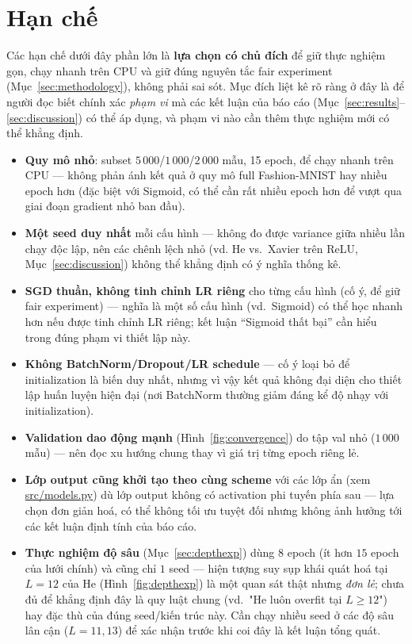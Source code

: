 \documentclass[12pt,a4paper]{article}
\begin{document}
\section{Hạn chế}
\label{sec:limitations}

Các hạn chế dưới đây phần lớn là \textbf{lựa chọn có chủ đích} để giữ thực
nghiệm gọn, chạy nhanh trên CPU và giữ đúng nguyên tắc fair experiment
(Mục~\ref{sec:methodology}), không phải sai sót. Mục đích liệt kê rõ ràng
ở đây là để người đọc biết chính xác \emph{phạm vi} mà các kết luận của
báo cáo (Mục~\ref{sec:results}--\ref{sec:discussion}) có thể áp dụng, và
phạm vi nào cần thêm thực nghiệm mới có thể khẳng định.

\begin{itemize}
\item \textbf{Quy mô nhỏ}: subset $5\,000$/$1\,000$/$2\,000$ mẫu, 15
  epoch, để chạy nhanh trên CPU --- không phản ánh kết quả ở quy mô full
  Fashion-MNIST hay nhiều epoch hơn (đặc biệt với Sigmoid, có thể cần rất
  nhiều epoch hơn để vượt qua giai đoạn gradient nhỏ ban đầu).
\item \textbf{Một seed duy nhất} mỗi cấu hình --- không đo được
  variance giữa nhiều lần chạy độc lập, nên các chênh lệch nhỏ (vd. He vs.\
  Xavier trên ReLU, Mục~\ref{sec:discussion}) không thể khẳng định có ý
  nghĩa thống kê.
\item \textbf{SGD thuần, không tinh chỉnh LR riêng} cho từng cấu hình
  (cố ý, để giữ fair experiment) --- nghĩa là một số cấu hình (vd.\
  Sigmoid) có thể học nhanh hơn nếu được tinh chỉnh LR riêng; kết luận
  ``Sigmoid thất bại'' cần hiểu trong đúng phạm vi thiết lập này.
\item \textbf{Không BatchNorm/Dropout/LR schedule} --- cố ý loại bỏ để
  initialization là biến duy nhất, nhưng vì vậy kết quả không đại diện cho
  thiết lập huấn luyện hiện đại (nơi BatchNorm thường giảm đáng kể độ nhạy
  với initialization).
\item \textbf{Validation dao động mạnh} (Hình~\ref{fig:convergence}) do
  tập val nhỏ ($1\,000$ mẫu) --- nên đọc xu hướng chung thay vì giá trị
  từng epoch riêng lẻ.
\item \textbf{Lớp output cũng khởi tạo theo cùng scheme} với các lớp ẩn
  (xem \url{src/models.py}) dù lớp output không có activation phi tuyến
  phía sau --- lựa chọn đơn giản hoá, có thể không tối ưu tuyệt đối nhưng
  không ảnh hưởng tới các kết luận định tính của báo cáo.
\item \textbf{Thực nghiệm độ sâu} (Mục~\ref{sec:depthexp}) dùng $8$ epoch
  (ít hơn $15$ epoch của lưới chính) và cũng chỉ $1$ seed --- hiện tượng
  suy sụp khái quát hoá tại $L{=}12$ của He (Hình~\ref{fig:depthexp}) là
  một quan sát thật nhưng \emph{đơn lẻ}; chưa đủ để khẳng định đây là quy
  luật chung (vd.\ "He luôn overfit tại $L\ge12$") hay đặc thù của đúng
  seed/kiến trúc này. Cần chạy nhiều seed ở các độ sâu lân cận
  ($L{=}11,13$) để xác nhận trước khi coi đây là kết luận tổng quát.
\end{itemize}
\end{document}
